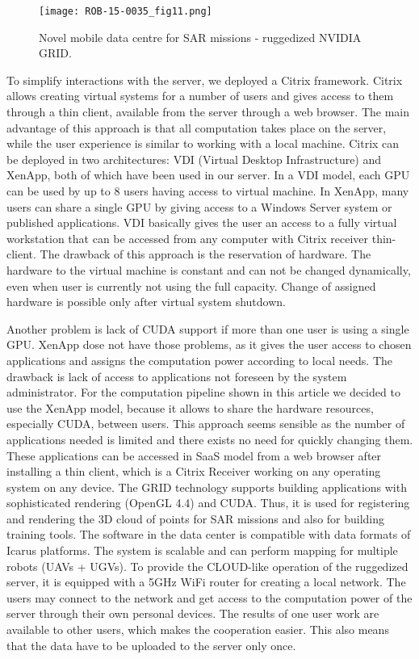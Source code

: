 \documentclass{article}
\begin{document}
\begin{figure} [h]
            \centering
         \texttt{[image: ROB-15-0035\_fig11.png]}
         \caption{Novel mobile data centre for SAR missions - ruggedized NVIDIA GRID.}
         \label{fig:grid}
   \end{figure}

To simplify interactions with the server, we deployed a Citrix framework. Citrix allows creating virtual systems for a number of users and gives access to them through a thin client, available from the server through a web browser. The main advantage of this approach is that all computation takes place on the server, while the user experience is similar to working with a local machine. Citrix can be deployed in two architectures:  VDI (Virtual Desktop Infrastructure) and XenApp, both of which have been used in our server.
In a VDI model, each GPU can be used by up to 8 users having access to virtual machine.
In XenApp, many users can share a single GPU by giving access to a Windows Server system or published applications.
VDI basically gives the user an access to a fully virtual workstation that can be accessed from any computer with Citrix receiver thin-client.
The drawback of this approach is the reservation of hardware. The hardware  to the virtual machine is constant and can not be changed dynamically, even when user is currently not using the full capacity. Change of assigned hardware is possible only after virtual system shutdown. 

Another problem is lack of CUDA support if more than one user is using a single GPU.
XenApp dose not have those problems, as it gives the user access to chosen applications and assigns the computation power according to local needs.
The drawback is lack of access to applications not foreseen by the system administrator.
For the computation pipeline shown in this article we decided to use the XenApp model, because it allows to share the hardware resources, especially CUDA, between users.
This approach seems sensible as the number of applications needed is limited and there exists no need for quickly changing them.
These applications can be accessed in SaaS model from a web browser after installing a thin client, which is a Citrix Receiver working on any operating system on any device.
The GRID technology supports building applications with sophisticated rendering (OpenGL 4.4) and CUDA.
Thus, it is used for registering and rendering the 3D cloud of points for SAR missions and also for building training tools. 
The software in the data center is compatible with data formats of Icarus platforms.
The system is scalable and can perform mapping for multiple robots (UAVs + UGVs).
To provide the CLOUD-like operation of the ruggedized server, it is equipped with a 5GHz WiFi router for creating a local network.
The users may connect to the network and get access to the computation power of the server through their own personal devices.
The results of one user work are available to other users, which makes the cooperation easier.
This also means that the data have to be uploaded to the server only once.
\end{document}
